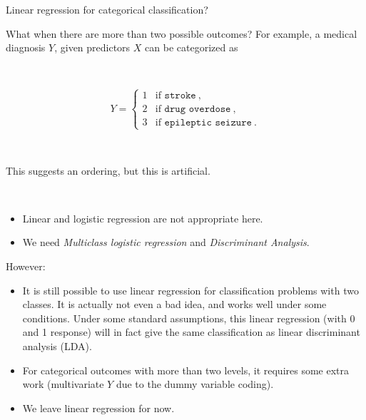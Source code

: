 \documentclass[
  10pt,
  ignorenonframetext,
]{beamer}
\providecommand{\tightlist}{%
  \setlength{\itemsep}{0pt}\setlength{\parskip}{0pt}}
\begin{document}
\begin{frame}
\begin{block}{Linear regression for categorical classification?}
\protect\hypertarget{linear-regression-for-categorical-classification}{}
\(~\)

What when there are more than two possible outcomes? For example, a
medical diagnosis \(Y\), given predictors \(X\) can be categorized as

\(~\)

\[Y = \left\{ \begin{array}{ll}
1 & \text{if } \texttt{stroke} \ , \\
2 & \text{if } \texttt{drug overdose} \ , \\
3 & \text{if } \texttt{epileptic seizure} \ .
\end{array} \right.\]

\(~\)

This suggests an ordering, but this is artificial.

\(~\)

\begin{itemize}
\tightlist
\item
  Linear and logistic regression are not appropriate here.
\item
  We need \emph{Multiclass logistic regression} and \emph{Discriminant
  Analysis}.
\end{itemize}
\end{block}
\end{frame}

\begin{frame}
\begin{block}{However:}
\protect\hypertarget{however}{}
\vspace{2mm}

\begin{itemize}
\tightlist
\item
  It is still possible to use linear regression for classification
  problems with two classes. It is actually not even a bad idea, and
  works well under some conditions. Under some standard assumptions,
  this linear regression (with 0 and 1 response) will in fact give the
  same classification as linear discriminant analysis (LDA).
\end{itemize}

\vspace{2mm}

\begin{itemize}
\tightlist
\item
  For categorical outcomes with more than two levels, it requires some
  extra work (multivariate \(Y\) due to the dummy variable coding).
\end{itemize}

\vspace{2mm}

\begin{itemize}
\tightlist
\item
  We leave linear regression for now.
\end{itemize}
\end{block}
\end{frame}
\end{document}
